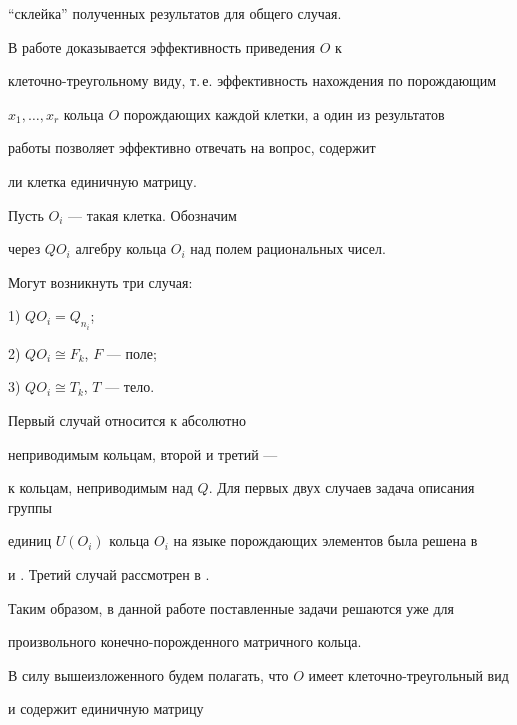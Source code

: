 ``склейка'' полученных результатов для общего случая.





В работе \cite{Pop1} доказывается эффективность приведения $O$ к


клеточно-треугольному виду, т.\,е. эффективность нахождения по порождающим


$x_1,\dotsc,x_r$ кольца $O$ порождающих каждой клетки, а один из результатов


работы \cite{Pop2} позволяет эффективно отвечать на вопрос, содержит


ли клетка единичную матрицу.





Пусть $O_i$ --- такая клетка. Обозначим


через $QO_i$ алгебру кольца $O_i$ над полем рациональных чисел.


Могут возникнуть три случая:





1) $QO_i = Q_{n_i}$;





2) $QO_i \cong F_k$, $F$ --- поле;





3) $QO_i \cong T_k$, $T$ --- тело.





\noindent{}Первый случай относится к абсолютно 


неприводимым кольцам, второй и третий ---


к кольцам, неприводимым над $Q$. Для первых двух случаев задача описания группы


единиц $U(O_i)$ кольца $O_i$ на языке порождающих элементов была решена в


\cite{Pop3} и \cite{Pop4}. Третий случай рассмотрен в \cite{Pop5}.


Таким образом, в данной работе поставленные задачи решаются уже для 


произвольного конечно-порожденного матричного кольца.





В силу вышеизложенного будем полагать, что $O$ имеет клеточно-треугольный вид


и содержит единичную матрицу


